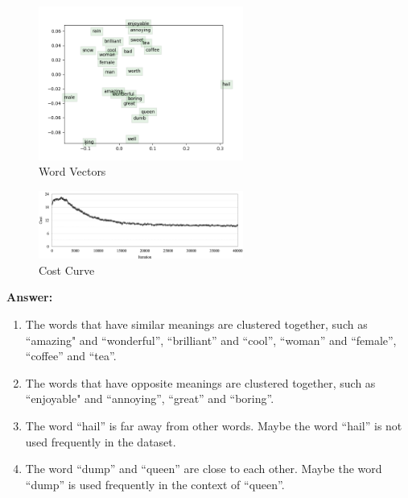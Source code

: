 \documentclass{article}
\newenvironment{answer}{
    {\bf Answer:} \sf \begingroup\color{red}
}{\endgroup}%
\begin{document}
\begin{enumerate}[label=(\alph*)]
\begin{figure}[h]
    \centering
    \includegraphics[width=0.6\textwidth]{../code/word_vectors.png}
    \caption{Word Vectors}
    \label{fig:word_vectors}
\end{figure}

\begin{figure}[h]
    \centering
    \includegraphics[width=0.6\textwidth]{../code/cost_curve.png}
    \caption{Cost Curve}
    \label{fig:cost_curve}
\end{figure}

\begin{shaded}
\begin{answer}

    \begin{enumerate}
        \item The words that have similar meanings are clustered together, such as ``amazing" and ``wonderful'', ``brilliant'' and ``cool'', ``woman'' and ``female'', ``coffee'' and ``tea''.
        \item The words that have opposite meanings are clustered together, such as ``enjoyable" and ``annoying'', ``great'' and ``boring''.
        \item The word ``hail'' is far away from other words. Maybe the word ``hail'' is not used frequently in the dataset.
        \item The word ``dump'' and ``queen'' are close to each other. Maybe the word ``dump'' is used frequently in the context of ``queen''.
    \end{enumerate}

\end{answer}
\end{shaded}


\end{enumerate}
\end{document}
